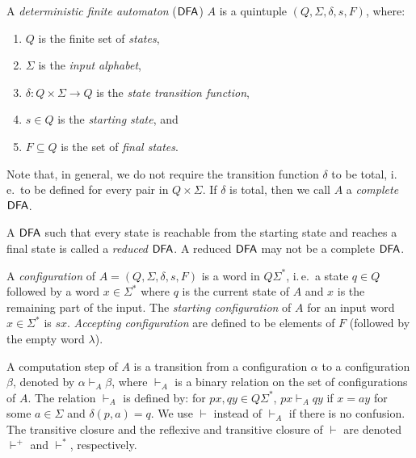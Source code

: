 A \emph{deterministic finite automaton} \index{$\DFA$}($\DFA$) $A$ is a quintuple $(Q, \Sigma, \delta, s, F)$, where:

\begin{enumerate}[]
\item $Q$ is the finite set of \emph{states},
\item $\Sigma$ is the \emph{input alphabet},
\item $\delta: Q \times \Sigma \to Q$ is the \emph{state transition function},
\item $s \in Q$ is the \emph{starting state}, and
\item $F \subseteq Q$ is the set of \emph{final states}.
\end{enumerate}

Note that, in general, we do not require the transition function $\delta$ to be total, i.\,e.\ to be defined for every pair in $Q \times \Sigma$. If $\delta$ is total, then we call $A$ a \emph{complete} $\DFA$.

A $\DFA$ such that every state is reachable from the starting state and reaches a final state is called a \emph{reduced} $\DFA$. A reduced $\DFA$ may not be a complete $\DFA$.

A \emph{configuration} of $A = (Q, \Sigma, \delta, s, F)$ is a word in $Q \Sigma^*$, i.\,e.\ a state $q \in Q$ followed by a word $x \in \Sigma^*$ where $q$ is the current state of $A$ and $x$ is the remaining part of the input. The \emph{starting configuration} of $A$ for an input word $x \in \Sigma^*$ is $sx$.  \emph{Accepting configuration} are defined to be elements of $F$ (followed by the empty word $\lambda$).

A computation step of $A$ is a transition from a configuration $\alpha$ to a configuration $\beta$, denoted by $\alpha \vdash_A \beta$, where $\vdash_A$ is a binary relation on the set of configurations of $A$. The relation $\vdash_A$ is defined by: for $px, qy \in Q \Sigma^*$, $px \vdash_A qy$ if $x = ay$ for some $a \in \Sigma$ and $\delta(p, a) = q$. We use $\vdash$ instead of $\vdash_A$ if there is no confusion. The transitive closure and the reflexive and transitive closure of $\vdash$ are denoted $\vdash^+$ and $\vdash^*$, respectively.

